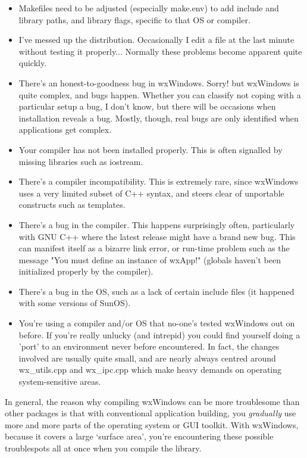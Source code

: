 \begin{itemize}
\item Makefiles need to be adjusted (especially make.env) to add include and
library paths, and library flags, specific to that OS or compiler.
\item I've messed up the distribution. Occasionally I edit a file at the last
minute without testing it properly... Normally these problems become apparent
quite quickly.
\item There's an honest-to-goodness bug in wxWindows. Sorry! but wxWindows is
quite complex, and bugs happen. Whether you can classify not coping with
a particular setup a bug, I don't know, but there will be occasions when
installation reveals a bug. Mostly, though, real bugs are only identified
when applications get complex.
\item Your compiler has not been installed properly. This is often signalled
by missing libraries such as iostream.
\item There's a compiler incompatibility. This is extremely rare, since
wxWindows uses a very limited subset of C++ syntax, and steers
clear of unportable constructs such as templates.
\item There's a bug in the compiler. This happens surprisingly often, particularly
with GNU C++ where the latest release might have a brand new bug. This can manifest
itself as a bizarre link error, or run-time problem such as the message "You must define an instance
of wxApp!" (globals haven't been initialized properly by the compiler).
\item There's a bug in the OS, such as a lack of certain include files (it happened
with some versions of SunOS).
\item You're using a compiler and/or OS that no-one's tested wxWindows out on before.
If you're really unlucky (and intrepid) you could find yourself doing a 'port'
to an environment never before encountered. In fact, the changes involved are
usually quite small, and are nearly always centred around wx\_utils.cpp and wx\_ipc.cpp
which make heavy demands on operating system-sensitive areas.
\end{itemize}

In general, the reason why compiling wxWindows can be more troublesome than other packages
is that with conventional application building, you {\it gradually} use more and more
parts of the operating system or GUI toolkit. With wxWindows, because it covers
a large `surface area', you're encountering these possible troublespots all at once
when you compile the library.

